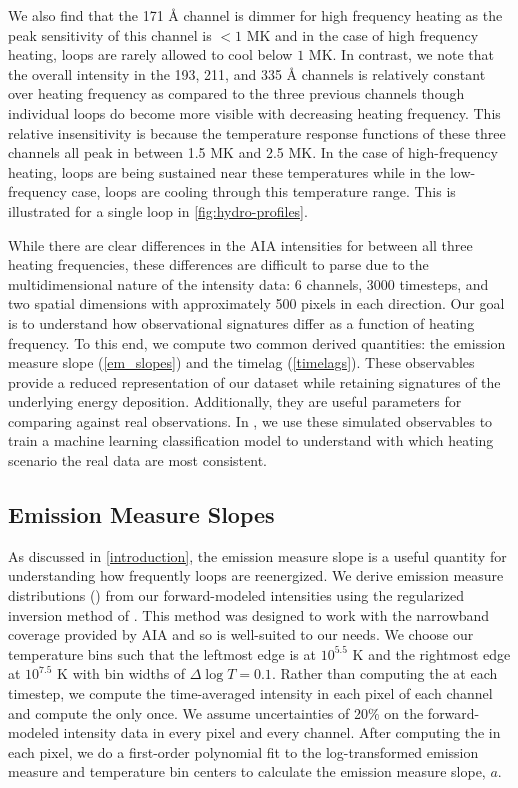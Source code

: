 We also find that the 171 \AA{} channel is dimmer for high frequency heating as the peak sensitivity of this channel is $<1$ MK and in the case of high frequency heating, loops are rarely allowed to cool below $1$ MK. In contrast, we note that the overall intensity in the 193, 211, and 335 \AA{} channels is relatively constant over heating frequency as compared to the three previous channels though individual loops do become more visible with decreasing heating frequency. This relative insensitivity is because the temperature response functions of these three channels all peak in between 1.5 MK and 2.5 MK. In the case of high-frequency heating, loops are being sustained near these temperatures while in the low-frequency case, loops are cooling through this temperature range. This is illustrated for a single loop in \autoref{fig:hydro-profiles}.

While there are clear differences in the AIA intensities for between all three heating frequencies, these differences are difficult to parse due to the multidimensional nature of the intensity data: 6 channels, 3000 timesteps, and two spatial dimensions with approximately 500 pixels in each direction. Our goal is to understand how observational signatures differ as a function of heating frequency. To this end, we compute two common derived quantities: the emission measure slope (\autoref{em_slopes}) and the timelag (\autoref{timelags}). These observables provide a reduced representation of our dataset while retaining signatures of the underlying energy deposition. Additionally, they are useful parameters for comparing against real observations. In , we use these simulated observables to train a machine learning classification model to understand with which heating scenario the real data are most consistent.

\subsection{Emission Measure Slopes}\label{em_slopes}

As discussed in \autoref{introduction}, the emission measure slope is a useful quantity for understanding how frequently loops are reenergized. We derive emission measure distributions (\dem{}) from our forward-modeled intensities using the regularized inversion method of \citet{hannah_differential_2012}. This method was designed to work with the narrowband coverage provided by AIA and so is well-suited to our needs. We choose our temperature bins such that the leftmost edge is at $10^{5.5}$ K and the rightmost edge at $10^{7.5}$ K with bin widths of $\Delta\log T=0.1$. Rather than computing the \dem{} at each timestep, we compute the time-averaged intensity in each pixel of each channel and compute the \dem{} only once. We assume uncertainties of 20\% on the forward-modeled intensity data in every pixel and every channel. After computing the \dem{} in each pixel, we do a first-order polynomial fit to the log-transformed emission measure and temperature bin centers to calculate the emission measure slope, $a$.

